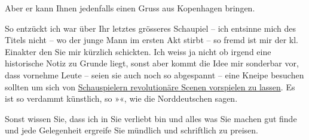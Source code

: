 \pstart
           Aber er kann Ihnen jedenfalls einen {\pb}Gruss aus Kopenhagen bringen.\pend
           
\pstart
           So entzückt ich war über Ihr letztes grösseres Schaupiel – ich entsinne mich des Titels nicht – wo der
               junge Mann im ersten Akt stirbt – so fremd ist mir der kl. Einakter den Sie mir kürzlich schickten.
               Ich weiss ja nicht ob irgend eine historische Notiz zu Grunde liegt, sonst aber kommt
               die Idee mir sonderbar vor, dass vornehme Leute – seien sie auch noch so abgespannt –
               eine Kneipe besuchen sollten um sich von \uline{Schauspielern
                  revolutionäre Scenen vorspielen zu lassen}. Es ist so verdammt künstlich, so
                  »\label{K_L00905-1v}\label{K_L00905-1}«, wie die Norddeutschen
               sagen.\pend
           
\pstart
           Sonst wissen Sie, dass ich in Sie verliebt bin und alles was Sie machen {\pb}gut finde und jede Gelegenheit
               ergreife Sie mündlich und schriftlich zu preisen.\pend
           
